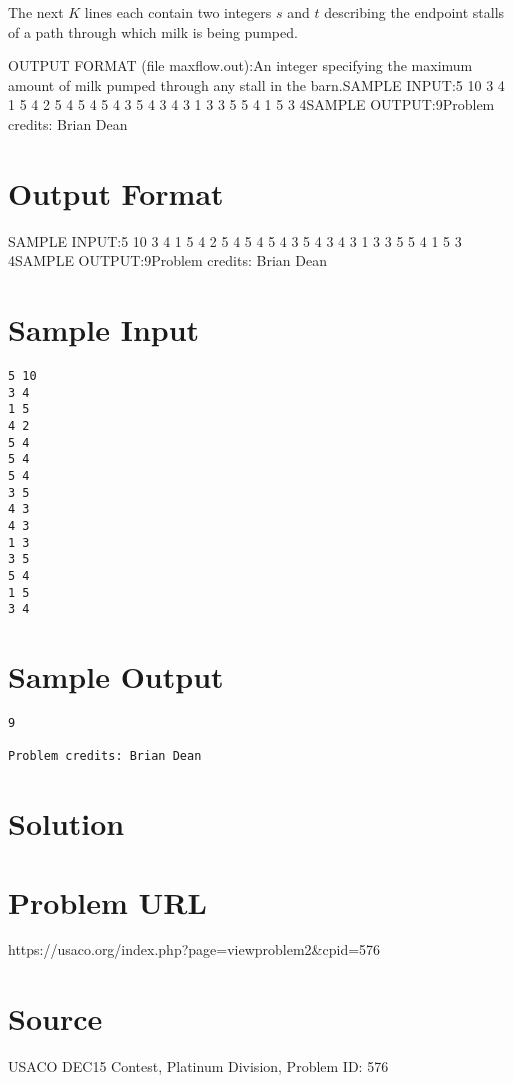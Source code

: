 \documentclass[12pt]{article}
\begin{document}
The next $K$ lines each contain two integers $s$ and $t$ describing the endpoint
stalls of a path through  which milk is being pumped.

OUTPUT FORMAT (file maxflow.out):An integer specifying the maximum amount of milk pumped through any stall in the
barn.SAMPLE INPUT:5 10
3 4
1 5
4 2
5 4
5 4
5 4
3 5
4 3
4 3
1 3
3 5
5 4
1 5
3 4SAMPLE OUTPUT:9Problem credits: Brian Dean

\section*{Output Format}
SAMPLE INPUT:5 10
3 4
1 5
4 2
5 4
5 4
5 4
3 5
4 3
4 3
1 3
3 5
5 4
1 5
3 4SAMPLE OUTPUT:9Problem credits: Brian Dean

\section*{Sample Input}
\begin{verbatim}
5 10
3 4
1 5
4 2
5 4
5 4
5 4
3 5
4 3
4 3
1 3
3 5
5 4
1 5
3 4
\end{verbatim}

\section*{Sample Output}
\begin{verbatim}
9

Problem credits: Brian Dean
\end{verbatim}

\section*{Solution}


\section*{Problem URL}
https://usaco.org/index.php?page=viewproblem2&cpid=576

\section*{Source}
USACO DEC15 Contest, Platinum Division, Problem ID: 576
\end{document}
